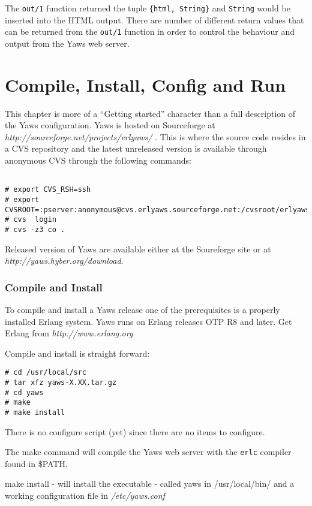 \documentclass[11pt,oneside,english]{book}
\begin{document}
The \verb+out/1+ function returned the tuple \verb+{html, String}+ and 
\verb+String+ would be inserted into the HTML output. There are number
of different return values that can be returned from the \verb+out/1+ function
in order to control the behaviour and output from the Yaws web server.



\chapter{Compile, Install, Config and Run}

This chapter is more of a ``Getting started'' character than a full
description of the Yaws configuration. 
Yaws is hosted on Sourceforge at 
\textit { http://sourceforge.net/projects/erlyaws/ }. This is where the source code
resides in a CVS repository and the latest unreleased version is
available through anonymous CVS through the following commands:

\begin{verbatim}

# export CVS_RSH=ssh 
# export CVSROOT=:pserver:anonymous@cvs.erlyaws.sourceforge.net:/cvsroot/erlyaws
# cvs  login
# cvs -z3 co .

\end{verbatim}


Released version of Yaws are available either at the Soureforge site or
at \textit{http://yaws.hyber.org/download}. 



\subsection{Compile and Install}

To compile and install a Yaws release
one of the prerequisites is a properly installed Erlang system. Yaws
runs on Erlang releases OTP R8 and later. Get Erlang from
\textit{http://www.erlang.org}

Compile and install is straight forward:
\begin{verbatim}
# cd /usr/local/src
# tar xfz yaws-X.XX.tar.gz
# cd yaws
# make 
# make install
\end{verbatim}

There is no configure script (yet) since there are no items
to configure. 

The make command will compile the Yaws web server with the \verb+erlc+
compiler found in \$PATH.

make install - will install the executable - called yaws in
/usr/local/bin/ and a working configuration file in \textit{ /etc/yaws.conf}
\end{document}
